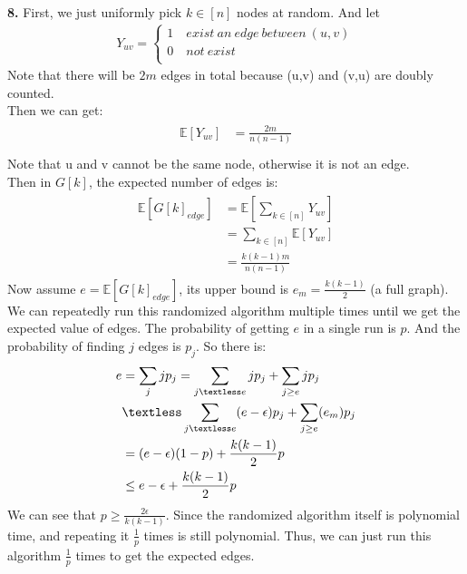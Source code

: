 \documentclass[titlepage, paper=a4, fontsize=11pt]{scrartcl} %
\numberwithin{equation}{section} %
\numberwithin{figure}{section} %
\numberwithin{table}{section} %
\begin{document}
\textbf{8.}
First, we just uniformly pick $k \in [n]$ nodes at random. And let
\begin{gather*}
Y_{uv} =
\begin{cases}
1 \quad exist\ an\ edge\ between\ (u,v) \\
0 \quad not\ exist \\
\end{cases}
\end{gather*}
Note that there will be $2m$ edges in total because (u,v) and (v,u) are doubly counted. \\
Then we can get:
\begin{align*} 
\begin{split}
\mathbb{E}[Y_{uv}] &= \frac{2m}{n(n-1)} \\
\end{split}					
\end{align*}
Note that u and v cannot be the same node, otherwise it is not an edge. \\
Then in $G[k]$, the expected number of edges is:
\begin{align*} 
\begin{split}
\mathbb{E}[G[k]_{edge}] &= \mathbb{E}[\sum_{k \in [n]} Y_{uv}] \\
&= \sum_{k \in [n]} \mathbb{E}[Y_{uv}] \\
&= \frac{k(k-1)m}{n(n-1)}
\end{split}					
\end{align*}
Now assume $e=\mathbb{E}[G[k]_{edge}]$, its upper bound is $e_m = \frac{k(k-1)}{2}$ (a full graph).
We can repeatedly run this randomized algorithm multiple times until we get the expected value of edges. The probability of getting $e$ in a single run is $p$. And the probability of finding $j$ edges is $p_j$.
So there is:
\begin{align*} 
\begin{split}
e &= \sum_{j}jp_j = \sum_{j \textless e}jp_j + \sum_{j \geq e}jp_j \\
&\textless \sum_{j \textless e}(e - \epsilon)p_j + \sum_{j \geq e}(e_m)p_j \\
&= (e-\epsilon)(1-p) + \frac{k(k-1)}{2}p \\
&\leq e - \epsilon + \frac{k(k-1)}{2}p
\end{split}					
\end{align*}
We can see that $p \geq \frac{2\epsilon}{k(k-1)}$. Since the randomized algorithm itself is polynomial time, and repeating it $\frac{1}{p}$ times is still polynomial. Thus, we can just run this algorithm $\frac{1}{p}$ times to get the expected edges.
\\
\end{document}
